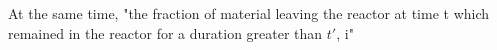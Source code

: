 At the same time, "the fraction of material leaving the reactor at time t which remained in the reactor for a duration greater than $t'$, i"  